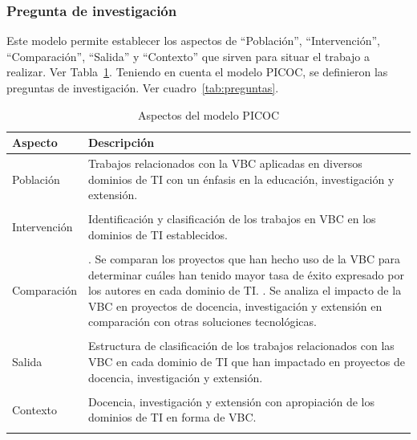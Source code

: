 \subsubsection{Pregunta de investigación}

Este modelo permite establecer los aspectos de ``Población'', ``Intervención'', ``Comparación'', ``Salida'' y ``Contexto'' que sirven para situar el trabajo a realizar. Ver Tabla~\ref{tab:PICOC}.
Teniendo en cuenta el modelo PICOC, se definieron las preguntas de investigación. Ver cuadro~\ref{tab:preguntas}.

\begin{table}[H]
    \centering
    \begin{tabular}{>{\centering\arraybackslash}m{} >{\arraybackslash}m{}}
        \hline
        \textbf{Aspecto} & \textbf{Descripción} \\
        \hline
        Población & Trabajos relacionados con la VBC aplicadas en diversos dominios de TI con un énfasis en la educación, investigación y extensión. \\
        \\
        Intervención & Identificación y clasificación de los trabajos en VBC en los dominios de TI establecidos. \\
        \\
        Comparación & 
        1. Se comparan los proyectos que han hecho uso de la VBC para determinar cuáles han tenido mayor tasa de éxito expresado por los autores en cada dominio de TI. \newline
        2. Se analiza el impacto de la VBC en proyectos de docencia, investigación y extensión en comparación con otras soluciones tecnológicas. \\
        \\
        Salida & Estructura de clasificación de los trabajos relacionados con las VBC en cada dominio de TI que han impactado en proyectos de docencia, investigación y extensión. \\
        \\
        Contexto & Docencia, investigación y extensión con apropiación de los dominios de TI en forma de VBC. \\
        \\
        \hline
    \end{tabular}
    \caption{Aspectos del modelo PICOC}\label{tab:PICOC}
\end{table}

